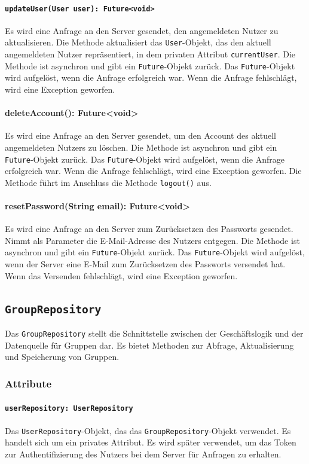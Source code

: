 \documentclass[parskip=full]{scrartcl}
\begin{document}
\paragraph{\texttt{updateUser(User user): Future<void>}}
Es wird eine Anfrage an den Server gesendet, den angemeldeten Nutzer zu aktualisieren. Die Methode aktualisiert das \texttt{User}-Objekt, das den aktuell angemeldeten Nutzer repräsentiert, in dem privaten Attribut \texttt{currentUser}.
Die Methode ist asynchron und gibt ein \texttt{Future}-Objekt zurück. Das \texttt{Future}-Objekt wird aufgelöst, wenn die Anfrage erfolgreich war. Wenn die Anfrage fehlschlägt, wird eine Exception geworfen.
\paragraph{deleteAccount(): Future<void>}
Es wird eine Anfrage an den Server gesendet, um den Account des aktuell angemeldeten Nutzers zu löschen. Die Methode ist asynchron und gibt ein \texttt{Future}-Objekt zurück. Das \texttt{Future}-Objekt wird aufgelöst, wenn die Anfrage erfolgreich war. Wenn die Anfrage fehlschlägt, wird eine Exception geworfen. Die Methode führt im Anschluss die Methode \texttt{logout()} aus.
\paragraph{resetPassword(String email): Future<void>}
Es wird eine Anfrage an den Server zum Zurücksetzen des Passworts gesendet. Nimmt als Parameter die E-Mail-Adresse des Nutzers entgegen. Die Methode ist asynchron und gibt ein \texttt{Future}-Objekt zurück. Das \texttt{Future}-Objekt wird aufgelöst, wenn der Server eine E-Mail zum Zurücksetzen des Passworts versendet hat. Wenn das Versenden fehlschlägt, wird eine Exception geworfen.

\newpage
\subsection{\texttt{GroupRepository}}
Das \texttt{GroupRepository} stellt die Schnittstelle zwischen der Geschäftslogik und der Datenquelle für Gruppen dar. Es bietet Methoden zur Abfrage, Aktualisierung und Speicherung von Gruppen.
\subsubsection*{Attribute}
\paragraph{\texttt{userRepository: UserRepository}}
Das \texttt{UserRepository}-Objekt, das das \texttt{GroupRepository}-Objekt verwendet. Es handelt sich um ein privates Attribut. Es wird später verwendet, um das Token zur Authentifizierung des Nutzers bei dem Server für Anfragen zu erhalten.
\end{document}
